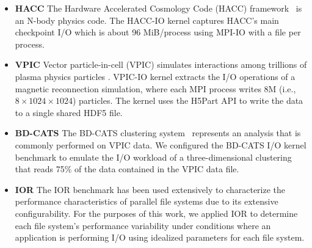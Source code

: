 \begin{itemize}
\item \textbf{HACC}
The Hardware Accelerated Cosmology Code (HACC) framework~\cite{habib2012}
is an N-body physics code.
The HACC-IO kernel captures HACC's main checkpoint I/O which is about
96 MiB/process 
using MPI-IO with a file per process. 
\item \textbf{VPIC} 
Vector particle-in-cell (VPIC) 
simulates interactions among trillions of plasma physics particles  \cite{Bowers2008}.
VPIC-IO kernel extracts the I/O operations of a magnetic reconnection
simulation, where each MPI process writes 8M (i.e., $8 \times 1024 \times 1024$) particles. 
The kernel uses the H5Part API \cite{H5Part} to write
the data to a single shared HDF5 file.

\item \textbf{BD-CATS} The BD-CATS clustering system~\cite{Patwary2015} represents
an analysis that is commonly performed on VPIC data.
We configured the BD-CATS I/O kernel benchmark to emulate the I/O workload of
a three-dimensional clustering that reads 75\% of the data
contained in the VPIC data file.

\item \textbf{IOR} The IOR benchmark has been used extensively
to characterize the performance characteristics of parallel file systems\cite{Yildiz2016,Xie2012,Lofstead2010,Uselton2010}
due to its extensive configurability.  For the purposes of this work, we applied
IOR to determine each file system's performance variability under conditions
where an application is performing I/O using idealized parameters for each
file system.

\end{itemize}


